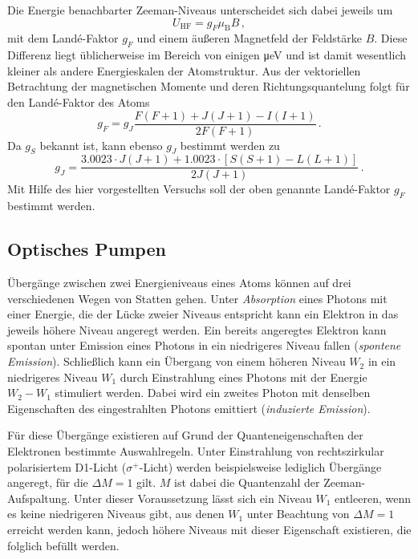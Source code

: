 Die Energie benachbarter Zeeman-Niveaus unterscheidet sich dabei jeweils um
\begin{equation}
\label{eq:zeeman_energie}
    U_\text{HF} = g_F \mu_\text{B} B\,,
\end{equation}
mit dem Landé-Faktor $g_F$ und einem äußeren Magnetfeld der Feldstärke $B$.
Diese Differenz liegt üblicherweise im Bereich von einigen
\si{\micro\electronvolt} und ist damit wesentlich kleiner als andere
Energieskalen der Atomstruktur.
Aus der vektoriellen Betrachtung der magnetischen Momente und deren
Richtungsquantelung folgt für den Landé-Faktor des Atoms
\begin{equation}
\label{eq:lande_faktor}
    g_F = g_J \frac{F(F+1) + J(J+1) - I(I+1)}{2F(F+1)}\,.
\end{equation}
Da $g_S$ bekannt ist, kann ebenso $g_J$ bestimmt werden zu
\begin{equation}
\label{eq:gj}
    g_J = \frac{\num{3.0023}\cdot J(J+1)
                + \num{1.0023}\cdot\left[S(S+1) - L(L+1)\right]}
               {2J(J+1)}
          \,.
\end{equation}
Mit Hilfe des hier vorgestellten Versuchs soll der oben genannte Landé-Faktor
$g_F$ bestimmt werden.

\subsection{Optisches Pumpen}
\label{subsec:optisches_pumpen}
Übergänge zwischen zwei Energieniveaus eines Atoms können auf drei
verschiedenen Wegen von Statten gehen. Unter \emph{Absorption} eines Photons
mit einer Energie, die der Lücke zweier Niveaus entspricht kann ein Elektron in
das jeweils höhere Niveau angeregt werden.  Ein bereits angeregtes Elektron
kann spontan unter Emission eines Photons in ein niedrigeres Niveau fallen
(\emph{spontene Emission}).
Schließlich kann ein Übergang von einem höheren Niveau $W_2$ in ein niedrigeres
Niveau $W_1$ durch Einstrahlung eines Photons mit der Energie $W_2 - W_1$
stimuliert werden.  Dabei wird ein zweites Photon mit denselben Eigenschaften
des eingestrahlten Photons emittiert (\emph{induzierte Emission}).

Für diese Übergänge existieren auf Grund der Quanteneigenschaften der
Elektronen bestimmte Auswahlregeln.  Unter Einstrahlung von rechtszirkular
polarisiertem D1-Licht ($\sigma^+$-Licht) werden beispielsweise lediglich
Übergänge angeregt, für die $\Delta M = \num{+1}$ gilt.  $M$ ist dabei die
Quantenzahl der Zeeman-Aufspaltung.  Unter dieser Voraussetzung lässt sich ein
Niveau $W_1$ entleeren, wenn es keine niedrigeren Niveaus gibt, aus denen $W_1$
unter Beachtung von $\Delta M = \num{+1}$ erreicht werden kann, jedoch höhere
Niveaus mit dieser Eigenschaft existieren, die folglich befüllt werden.

